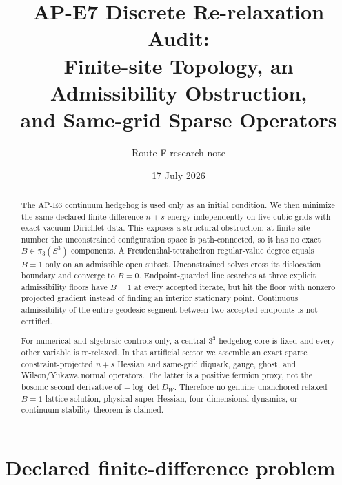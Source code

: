 \documentclass[11pt]{article}
\title{AP-E7 Discrete Re-relaxation Audit:\\
Finite-site Topology, an Admissibility Obstruction,\\
and Same-grid Sparse Operators}
\author{Route F research note}
\date{17 July 2026}
\theoremstyle{definition}
\theoremstyle{remark}
\begin{document}
\maketitle

\begin{abstract}
The AP-E6 continuum hedgehog is used only as an initial condition. We then
minimize the same declared finite-difference $n+s$ energy independently on
five cubic grids with exact-vacuum Dirichlet data. This exposes a structural
obstruction: at finite site number the unconstrained configuration space is
path-connected, so it has no exact $B\in\pi_3(S^3)$ components. A
Freudenthal-tetrahedron regular-value degree equals $B=1$ only on an
admissible open subset. Unconstrained solves cross its dislocation boundary
and converge to $B=0$. Endpoint-guarded line searches at three explicit
admissibility floors have $B=1$ at every accepted iterate, but hit the floor
with nonzero projected gradient instead of finding an interior stationary
point. Continuous admissibility of the entire geodesic segment between two
accepted endpoints is not certified.

For numerical and algebraic controls only, a central $3^3$ hedgehog core is
fixed and every other variable is re-relaxed. In that artificial sector we
assemble an exact sparse constraint-projected $n+s$ Hessian and same-grid
diquark, gauge, ghost, and Wilson/Yukawa normal operators. The latter is a
positive fermion proxy, not the bosonic second derivative of
$-\log\det D_W$. Therefore no genuine unanchored relaxed $B=1$ lattice
solution, physical super-Hessian, four-dimensional dynamics, or continuum
stability theorem is claimed.
\end{abstract}

\tableofcontents

\section{Declared finite-difference problem}
\end{document}
